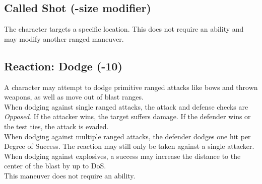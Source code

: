 \subsection*{Called Shot (-size modifier)}
The character targets a specific location. This does not require an ability and may modify another ranged maneuver.
\subsection*{Reaction: Dodge (-10)}
A character may attempt to dodge primitive ranged attacks like bows and thrown weapons, as well as move out of blast ranges.\\
When dodging against single ranged attacks, the attack and defense checks are \emph{Opposed}.
If the attacker wins, the target suffers damage.
If the defender wins or the test ties, the attack is evaded.
\\%
When dodging against multiple ranged attacks, the defender dodges one hit per Degree of Success.
The reaction may still only be taken against a single attacker.
\\%
When dodging against explosives, a success may increase the distance to the center of the blast by up to DoS.\\
This maneuver does not require an ability.
